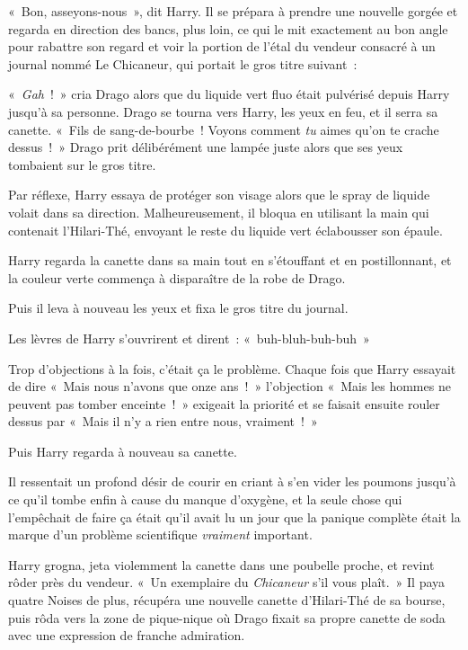 «~Bon, asseyons-nous~», dit Harry. Il se prépara à prendre une nouvelle gorgée et regarda en direction des bancs, plus loin, ce qui le mit exactement au bon angle pour rabattre son regard et voir la portion de l'étal du vendeur consacré à un journal nommé Le Chicaneur, qui portait le gros titre suivant~:


«~\emph{Gah}~!~» cria Drago alors que du liquide vert fluo était pulvérisé depuis Harry jusqu'à sa personne. Drago se tourna vers Harry, les yeux en feu, et il serra sa canette. «~Fils de sang-de-bourbe~! Voyons comment \emph{tu} aimes qu'on te crache dessus~!~» Drago prit délibérément une lampée juste alors que ses yeux tombaient sur le gros titre.

Par réflexe, Harry essaya de protéger son visage alors que le spray de liquide volait dans sa direction. Malheureusement, il bloqua en utilisant la main qui contenait l'Hilari-Thé, envoyant le reste du liquide vert éclabousser son épaule.

Harry regarda la canette dans sa main tout en s'étouffant et en postillonnant, et la couleur verte commença à disparaître de la robe de Drago.

Puis il leva à nouveau les yeux et fixa le gros titre du journal.


Les lèvres de Harry s'ouvrirent et dirent~: «~buh-bluh-buh-buh~»

Trop d'objections à la fois, c'était ça le problème. Chaque fois que Harry essayait de dire «~Mais nous n'avons que onze ans~!~» l'objection «~Mais les hommes ne peuvent pas tomber enceinte~!~» exigeait la priorité et se faisait ensuite rouler dessus par «~Mais il n'y a rien entre nous, vraiment~!~»

Puis Harry regarda à nouveau sa canette.

Il ressentait un profond désir de courir en criant à s'en vider les poumons jusqu'à ce qu'il tombe enfin à cause du manque d'oxygène, et la seule chose qui l'empêchait de faire ça était qu'il avait lu un jour que la panique complète était la marque d'un problème scientifique \emph{vraiment} important.

Harry grogna, jeta violemment la canette dans une poubelle proche, et revint rôder près du vendeur. «~Un exemplaire du \emph{Chicaneur} s'il vous plaît.~» Il paya quatre Noises de plus, récupéra une nouvelle canette d'Hilari-Thé de sa bourse, puis rôda vers la zone de pique-nique où Drago fixait sa propre canette de soda avec une expression de franche admiration.

